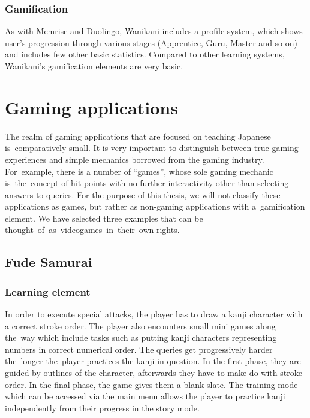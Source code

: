 \documentclass[thesis=B,english,hidelinks]{FITthesisXE}[2012/06/26]
\begin{document}
\subsubsection{Gamification}

As with Memrise and Duolingo, Wanikani includes a profile system, which shows user's progression through various stages (Apprentice, Guru, Master and so on) and includes few other basic statistics. Compared to other learning systems, Wanikani's gamification elements are very basic.

\section{Gaming applications}

The realm of gaming applications that are focused on teaching Japanese is~comparatively small. It is very important to distinguish between true gaming experiences and simple mechanics borrowed from the gaming industry. For~example, there is a number of ``games'', whose sole gaming mechanic is~the~concept of hit points with no further interactivity other than selecting answers to queries. For the purpose of this thesis, we will not classify these applications as games, but rather as non-gaming applications with a~gamification element. We have selected three examples that can be thought~of~as~videogames~in~their~own rights\autocite{fude}\autocite{owari}\autocite{hirbattle}.

\subsection{Fude Samurai}

\subsubsection{Learning element}

In order to execute special attacks, the player has to draw a kanji character with a correct stroke order. The player also encounters small mini games along the~way which include tasks such as putting kanji characters representing numbers in correct numerical order. The queries get progressively harder the~longer the~player practices the kanji in question. In the first phase, they are guided by outlines of the character, afterwards they have to make do with stroke order. In the final phase, the game gives them a blank slate. The training mode which can be accessed via the main menu allows the player to practice kanji independently from their progress in the story mode.
\end{document}
